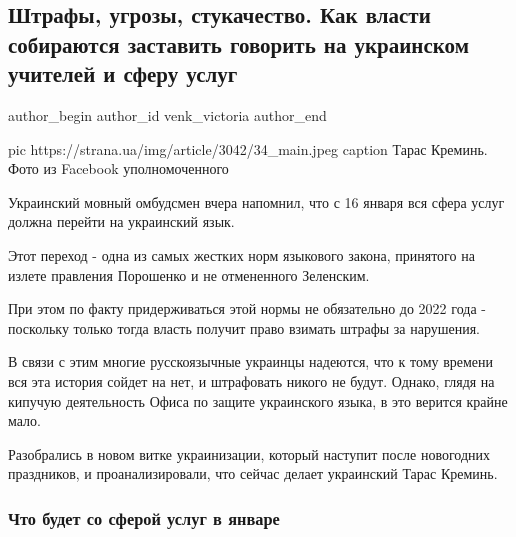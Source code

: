  
 
 
 
 
 
\subsection{Штрафы, угрозы, стукачество. Как власти собираются заставить говорить на украинском учителей и сферу услуг}
\label{sec:02_12_2020.news.ua.strana.venk_victoria.1.mova_shtrafy_ukrainizacia}
\ifcmt
	author_begin
   author_id venk_victoria
	author_end
\fi

\ifcmt
pic https://strana.ua/img/article/3042/34_main.jpeg
caption Тарас Креминь. Фото из Facebook уполномоченного
\fi

Украинский мовный омбудсмен вчера напомнил, что с 16 января вся сфера услуг
должна перейти на украинский язык. 

Этот переход - одна из самых жестких норм языкового закона, принятого на излете
правления Порошенко и не отмененного Зеленским. 

При этом по факту придерживаться этой нормы не обязательно до 2022 года -
поскольку только тогда власть получит право взимать штрафы за нарушения. 

В связи с этим многие русскоязычные украинцы надеются, что к тому времени вся
эта история сойдет на нет, и штрафовать никого не будут. Однако, глядя на
кипучую деятельность Офиса по защите украинского языка, в это верится крайне
мало. 

Разобрались в новом витке украинизации, который наступит после новогодних
праздников, и проанализировали, что сейчас делает украинский 
Тарас Креминь. 

\subsubsection{Что будет со сферой услуг в январе}

